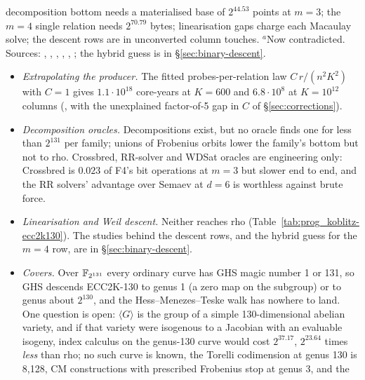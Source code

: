 \begin{table}[t]
{decomposition bottom needs a materialised base of $2^{44.53}$ points at
$m=3$; the $m=4$ single relation needs $2^{70.79}$ bytes; linearisation
gaps charge each Macaulay solve; the descent rows are in unconverted column
touches. $^{a}$Now contradicted. Sources:
,
,
,
,
,
; the
hybrid guess is in \S\ref{sec:binary-descent}.}
\label{tab:prog_koblitz-ecc2k130}
\end{table}

\begin{itemize}
\item \emph{Extrapolating the producer.} The fitted probes-per-relation law
  $C\,r/(n^2K^2)$ with $C=1$ gives $1.1\cdot10^{18}$ core-years at $K=600$
  and $6.8\cdot10^{8}$ at $K=10^{12}$ columns
  (, with the unexplained
  factor-of-5 gap in $C$ of \S\ref{sec:corrections}).
\item \emph{Decomposition oracles.} Decompositions exist, but no oracle
  finds one for less than $2^{131}$ per family; unions of Frobenius orbits
  lower the family's bottom but not to rho. Crossbred, RR-solver and WDSat
  oracles are engineering only: Crossbred is $0.023$ of F4's bit operations
  at $m=3$ but slower end to end, and the RR solvers' advantage over Semaev
  at $d=6$ is worthless against brute force.
\item \emph{Linearisation and Weil descent.} Neither reaches rho
  (Table~\ref{tab:prog_koblitz-ecc2k130}). The studies behind the descent
  rows, and the hybrid guess for the $m=4$ row, are in
  \S\ref{sec:binary-descent}.
\item \emph{Covers.} Over $\mathbb{F}_{2^{131}}$ every ordinary curve has GHS
  magic number 1 or 131, so GHS descends ECC2K-130 to genus 1 (a zero map on
  the subgroup) or to genus about $2^{130}$, and the Hess--Menezes--Teske walk
  has nowhere to land. One question is open: $\langle G\rangle$ is the group
  of a simple 130-dimensional abelian variety, and if that variety were
  isogenous to a Jacobian with an evaluable isogeny, index calculus on the
  genus-130 curve would cost $2^{37.17}$, $2^{23.64}$ times \emph{less} than
  rho; no such curve is known, the Torelli codimension at genus 130 is
  8{,}128, CM constructions with prescribed Frobenius stop at genus 3, and the

\end{itemize}
